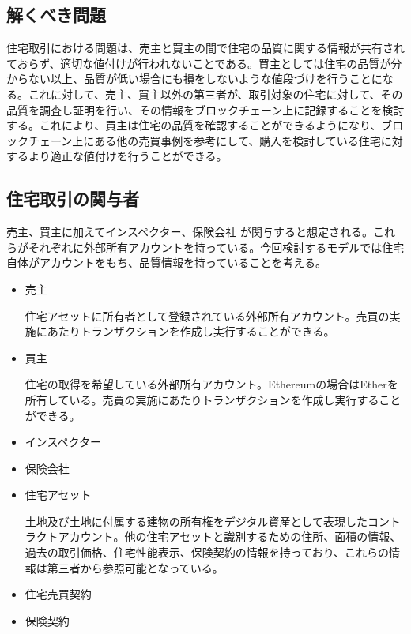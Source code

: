 \documentclass[a4paper,11pt]{jlreq}
\begin{document}
\subsection{解くべき問題}
住宅取引における問題は、売主と買主の間で住宅の品質に関する情報が共有されておらず、適切な値付けが行われないことである。買主としては住宅の品質が分からない以上、品質が低い場合にも損をしないような値段づけを行うことになる。これに対して、売主、買主以外の第三者が、取引対象の住宅に対して、その品質を調査し証明を行い、その情報をブロックチェーン上に記録することを検討する。これにより、買主は住宅の品質を確認することができるようになり、ブロックチェーン上にある他の売買事例を参考にして、購入を検討している住宅に対するより適正な値付けを行うことができる。

\subsection{住宅取引の関与者}
売主、買主に加えてインスペクター、保険会社%
が関与すると想定される。これらがそれぞれに外部所有アカウントを持っている。今回検討するモデルでは住宅自体がアカウントをもち、品質情報を持っていることを考える。
\begin{itemize}
	\item 売主
    \par 住宅アセットに所有者として登録されている外部所有アカウント。売買の実施にあたりトランザクションを作成し実行することができる。
    \item 買主
    \par 住宅の取得を希望している外部所有アカウント。Ethereumの場合はEtherを所有している。売買の実施にあたりトランザクションを作成し実行することができる。
    \item インスペクター
    \par 
    \item 保険会社
	\item 住宅アセット	
	\par 土地及び土地に付属する建物の所有権をデジタル資産として表現したコントラクトアカウント。他の住宅アセットと識別するための住所、面積の情報、過去の取引価格、住宅性能表示、保険契約の情報を持っており、これらの情報は第三者から参照可能となっている。
	\item 住宅売買契約
	\item 保険契約

\end{itemize}
\end{document}
